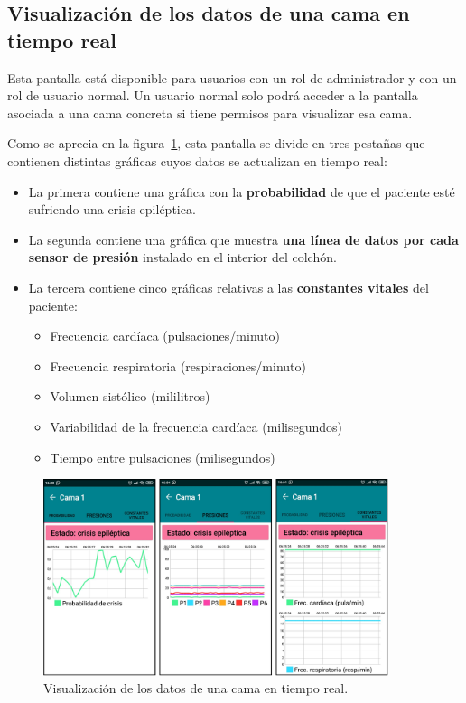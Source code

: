 \subsection{Visualización de los datos de una cama en tiempo real}

Esta pantalla está disponible para usuarios con un rol de administrador y con un rol de usuario normal. Un usuario normal solo podrá acceder a la pantalla asociada a una cama concreta si tiene permisos para visualizar esa cama. 

Como se aprecia en la figura~\ref{fig:datoscama}, esta pantalla se divide en tres pestañas que contienen distintas gráficas cuyos datos se actualizan en tiempo real: 

\begin{itemize}
	\item La primera contiene una gráfica con la \textbf{probabilidad} de que el paciente esté sufriendo una crisis epiléptica. 
	\item La segunda contiene una gráfica que muestra \textbf{una línea de datos por cada sensor de presión} instalado en el interior del colchón. 
	\item La tercera contiene cinco gráficas relativas a las \textbf{constantes vitales} del paciente: 
	\begin{itemize}
		\item Frecuencia cardíaca (pulsaciones/minuto)
		\item Frecuencia respiratoria (respiraciones/minuto)
		\item Volumen sistólico (mililitros)
		\item Variabilidad de la frecuencia cardíaca (milisegundos)
		\item Tiempo entre pulsaciones (milisegundos)
	\end{itemize}
\end{itemize}

\begin{figure}[H]
	\centering
	\includegraphics[width=0.9\textwidth]{../img/datoscama.png}
	\caption{Visualización de los datos de una cama en tiempo real.}
	\label{fig:datoscama}
\end{figure}

